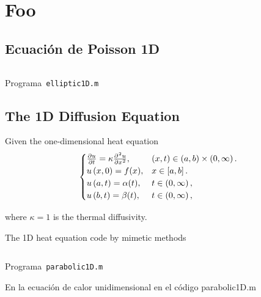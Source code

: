 \documentclass[a4paper,abstract=true]{scrreprt}
\begin{document}
\chapter{Foo}

\section{Ecuación de Poisson 1D}

\begin{listing}[ht!]
    \tiny
    \centering
    \inputminted[frame=single,framesep=10pt,linenos,firstline=1,lastline=53,highlightlines={21,29}]{octave}{../examples/octave/elliptic1D.m}
    \caption{Programa~\texttt{elliptic1D.m}}
    \label{code:elliptic1D.m}
\end{listing}

\section{The 1D Diffusion Equation}

Given the one-dimensional heat equation
\begin{equation}\label{eq:IBVPheat1d}
    \begin{cases}
        \diffp{u}{t}=
        \kappa\diffp[2]{u}{x},
         & \left(x,t\right)\in
        \left(a,b \right)\times\left(0, \infty \right). \\
        u\left(x,0\right)=f(x),
         & x\in
        \left[a,b\right].                       \\
        u\left(a,t\right)= \alpha(t), & t\in
        \left(0,\infty\right),\\
        u\left(b,t\right)= \beta(t),
         & t\in
        \left(0,\infty\right),
    \end{cases}
\end{equation}

where $\kappa=1$ is the thermal diffusivity.

The 1D heat equation code by mimetic methods

\begin{listing}[ht!]
    \tiny
    \centering
    \inputminted[frame=single,framesep=10pt,linenos,firstline=1,lastline=80,highlightlines={20,29}]{octave}{../examples/octave/parabolic1D.m}
    \caption{Programa~\texttt{parabolic1D.m}}
    \label{code:parabolic1D.m}
\end{listing}


En  la ecuación de calor unidimensional en el código parabolic1D.m
\end{document}
